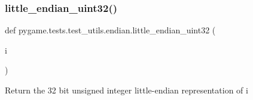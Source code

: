 \subsubsection{\texorpdfstring{little\+\_\+endian\+\_\+uint32()}{little\_endian\_uint32()}}
{\footnotesize\ttfamily def pygame.\+tests.\+test\+\_\+utils.\+endian.\+little\+\_\+endian\+\_\+uint32 (\begin{DoxyParamCaption}\item[{}]{i }\end{DoxyParamCaption})}

\begin{DoxyVerb}Return the 32 bit unsigned integer little-endian representation of i\end{DoxyVerb}
 